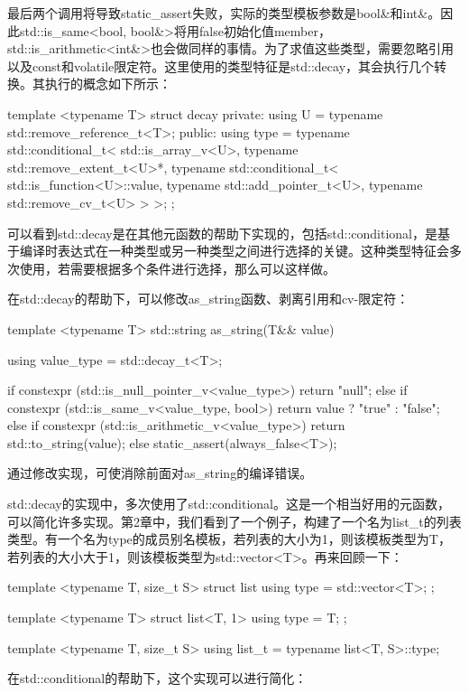 最后两个调用将导致static\_assert失败，实际的类型模板参数是bool\&和int\&。因此std::is\_same<bool, bool\&>将用false初始化值member，std::is\_arithmetic<int\&>也会做同样的事情。为了求值这些类型，需要忽略引用以及const和volatile限定符。这里使用的类型特征是std::decay，其会执行几个转换。其执行的概念如下所示：

\begin{cpp}
template <typename T>
struct decay
{
private:
	using U = typename std::remove_reference_t<T>;
public:
	using type = typename std::conditional_t<
		std::is_array_v<U>,
		typename std::remove_extent_t<U>*,
		typename std::conditional_t<
			std::is_function<U>::value,
			typename std::add_pointer_t<U>,
			typename std::remove_cv_t<U>
		>
	>;
};
\end{cpp}

可以看到std::decay是在其他元函数的帮助下实现的，包括std::conditional，是基于编译时表达式在一种类型或另一种类型之间进行选择的关键。这种类型特征会多次使用，若需要根据多个条件进行选择，那么可以这样做。

在std::decay的帮助下，可以修改as\_string函数、剥离引用和cv-限定符：

\begin{cpp}
template <typename T>
std::string as_string(T&& value)
{
	using value_type = std::decay_t<T>;

	if constexpr (std::is_null_pointer_v<value_type>)
		return "null";
	else if constexpr (std::is_same_v<value_type, bool>)
		return value ? "true" : "false";
	else if constexpr (std::is_arithmetic_v<value_type>)
		return std::to_string(value);
	else
		static_assert(always_false<T>);
}
\end{cpp}

通过修改实现，可使消除前面对as\_string的编译错误。

std::decay的实现中，多次使用了std::conditional。这是一个相当好用的元函数，可以简化许多实现。第2章中，我们看到了一个例子，构建了一个名为list\_t的列表类型。有一个名为type的成员别名模板，若列表的大小为1，则该模板类型为T，若列表的大小大于1，则该模板类型为std::vector<T>。再来回顾一下：

\begin{cpp}
template <typename T, size_t S>
struct list
{
	using type = std::vector<T>;
};

template <typename T>
struct list<T, 1>
{
	using type = T;
};

template <typename T, size_t S>
using list_t = typename list<T, S>::type;
\end{cpp}

在std::conditional的帮助下，这个实现可以进行简化：

